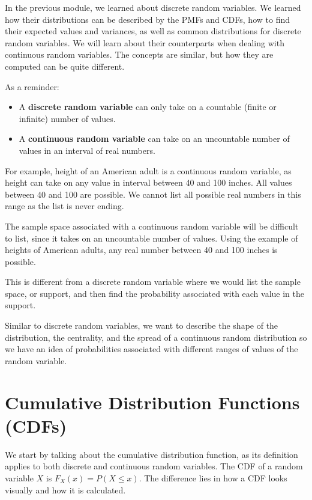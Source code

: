 \documentclass[
]{book}
\providecommand{\tightlist}{%
  \setlength{\itemsep}{0pt}\setlength{\parskip}{0pt}}
\begin{document}
In the previous module, we learned about discrete random variables. We learned how their distributions can be described by the PMFs and CDFs, how to find their expected values and variances, as well as common distributions for discrete random variables. We will learn about their counterparts when dealing with continuous random variables. The concepts are similar, but how they are computed can be quite different.

As a reminder:

\begin{itemize}
\tightlist
\item
  A \textbf{discrete random variable} can only take on a countable (finite or infinite) number of values.
\item
  A \textbf{continuous random variable} can take on an uncountable number of values in an interval of real numbers.
\end{itemize}

For example, height of an American adult is a continuous random variable, as height can take on any value in interval between 40 and 100 inches. All values between 40 and 100 are possible. We cannot list all possible real numbers in this range as the list is never ending.

The sample space associated with a continuous random variable will be difficult to list, since it takes on an uncountable number of values. Using the example of heights of American adults, any real number between 40 and 100 inches is possible.

This is different from a discrete random variable where we would list the sample space, or support, and then find the probability associated with each value in the support.

Similar to discrete random variables, we want to describe the shape of the distribution, the centrality, and the spread of a continuous random distribution so we have an idea of probabilities associated with different ranges of values of the random variable.

\section{Cumulative Distribution Functions (CDFs)}\label{cumulative-distribution-functions-cdfs-1}

We start by talking about the cumulative distribution function, as its definition applies to both discrete and continuous random variables. The CDF of a random variable \(X\) is \(F_X(x) = P(X \leq x)\). The difference lies in how a CDF looks visually and how it is calculated.
\end{document}

